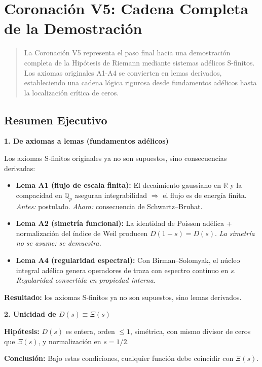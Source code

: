 \section{Coronación V5: Cadena Completa de la Demostración}

\begin{abstract}
La Coronación V5 representa el paso final hacia una demostración completa de la Hipótesis de Riemann mediante sistemas adélicos S-finitos. Los axiomas originales A1-A4 se convierten en lemas derivados, estableciendo una cadena lógica rigurosa desde fundamentos adélicos hasta la localización crítica de ceros.
\end{abstract}

\subsection*{Resumen Ejecutivo}

\textbf{1. De axiomas a lemas (fundamentos adélicos)}

Los axiomas S-finitos originales ya no son supuestos, sino consecuencias derivadas:

\begin{itemize}
\item \textbf{Lema A1 (flujo de escala finita):} El decaimiento gaussiano en $\mathbb{R}$ y la compacidad en $\mathbb{Q}_p$ aseguran integrabilidad $\Rightarrow$ el flujo es de energía finita. 
\emph{Antes:} postulado. \emph{Ahora:} consecuencia de Schwartz--Bruhat.

\item \textbf{Lema A2 (simetría funcional):} La identidad de Poisson adélica + normalización del índice de Weil producen $D(1-s)=D(s)$.
\emph{La simetría no se asume: se demuestra.}

\item \textbf{Lema A4 (regularidad espectral):} Con Birman--Solomyak, el núcleo integral adélico genera operadores de traza con espectro continuo en $s$.
\emph{Regularidad convertida en propiedad interna.}
\end{itemize}

\textbf{Resultado:} los axiomas S-finitos ya no son supuestos, sino lemas derivados.

\textbf{2. Unicidad de $D(s) \equiv \Xi(s)$}

\begin{theorem}
\textbf{Hipótesis:} $D(s)$ es entera, orden $\leq 1$, simétrica, con mismo divisor de ceros que $\Xi(s)$, y normalización en $s=1/2$.

\textbf{Conclusión:} Bajo estas condiciones, cualquier función debe coincidir con $\Xi(s)$.
\end{theorem}

